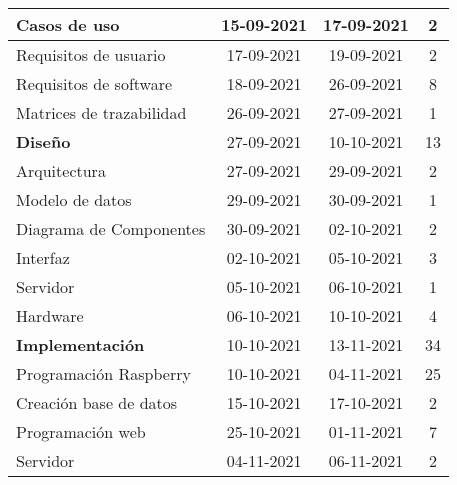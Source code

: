 \begin{longtable}[c]{lcc|c|}
	\multicolumn{1}{|l|}{Casos de uso}                       & \multicolumn{1}{c|}{15-09-2021} & 17-09-2021     & 2   \\ \hline
	\multicolumn{1}{|l|}{Requisitos de usuario}              & \multicolumn{1}{c|}{17-09-2021} & 19-09-2021     & 2   \\ \hline
	\multicolumn{1}{|l|}{Requisitos de software}             & \multicolumn{1}{c|}{18-09-2021} & 26-09-2021     & 8   \\ \hline
	\multicolumn{1}{|l|}{Matrices de trazabilidad}           & \multicolumn{1}{c|}{26-09-2021} & 27-09-2021     & 1   \\ \hline
	\multicolumn{1}{|l|}{\textbf{Diseño}}                    & \multicolumn{1}{c|}{27-09-2021} & 10-10-2021     & 13  \\ \hline
	\multicolumn{1}{|l|}{Arquitectura}                       & \multicolumn{1}{c|}{27-09-2021} & 29-09-2021     & 2   \\ \hline
	\multicolumn{1}{|l|}{Modelo de datos}                    & \multicolumn{1}{c|}{29-09-2021} & 30-09-2021     & 1   \\ \hline
	\multicolumn{1}{|l|}{Diagrama de Componentes}            & \multicolumn{1}{c|}{30-09-2021} & 02-10-2021     & 2   \\ \hline
	\multicolumn{1}{|l|}{Interfaz}                           & \multicolumn{1}{c|}{02-10-2021} & 05-10-2021     & 3   \\ \hline
	\multicolumn{1}{|l|}{Servidor}                           & \multicolumn{1}{c|}{05-10-2021} & 06-10-2021     & 1   \\ \hline
	\multicolumn{1}{|l|}{Hardware}                           & \multicolumn{1}{c|}{06-10-2021} & 10-10-2021     & 4   \\ \hline
	\multicolumn{1}{|l|}{\textbf{Implementación}}            & \multicolumn{1}{c|}{10-10-2021} & 13-11-2021     & 34  \\ \hline
	\multicolumn{1}{|l|}{Programación Raspberry}             & \multicolumn{1}{c|}{10-10-2021} & 04-11-2021     & 25  \\ \hline
	\multicolumn{1}{|l|}{Creación base de datos}             & \multicolumn{1}{c|}{15-10-2021} & 17-10-2021     & 2   \\ \hline
	\multicolumn{1}{|l|}{Programación web}                   & \multicolumn{1}{c|}{25-10-2021} & 01-11-2021     & 7   \\ \hline
	\multicolumn{1}{|l|}{Servidor}                           & \multicolumn{1}{c|}{04-11-2021} & 06-11-2021     & 2   \\ \hline

\end{longtable}
